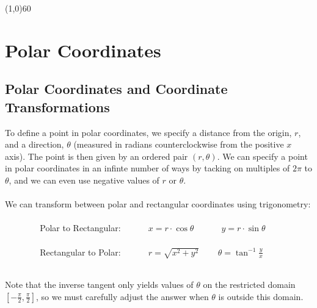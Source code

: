 \documentclass[10.5pt,twoside]{report}
\theoremstyle{definition}
\begin{document}
\line(1,0){60}
\linethickness{0.5mm}
\pagebreak

\section{Polar Coordinates}\label{Polar Coordinates}

\subsection{Polar Coordinates and Coordinate Transformations}

To define a point in polar coordinates, we specify a distance from the origin, $r$, and a direction, $\theta$ (measured in radians counterclockwise from the positive $x$ axis).  The point is then given by an ordered pair $(r,\theta)$.  We can specify a point in polar coordinates in an infinte number of ways by tacking on multiples of $2\pi$ to $\theta$, and we can even use negative values of $r$ or $\theta$. \\
${}$\\
We can transform between polar and rectangular coordinates using trigonometry:\\
${}$\\

\verb|        |Polar to Rectangular: \verb|     | $x=r\cdot \cos{\theta}$ \verb|     | $y=r\cdot \sin{\theta}$\\
${}$\\
\verb|        |Rectangular to Polar: \verb|     | $r=\sqrt{x^2+y^2}$ \verb|   |  $\theta = \tan^{-1} \frac{y}{x}$

${}$\\
Note that the inverse tangent only yields values of $\theta$ on the restricted domain $\left[ -\frac{\pi}{2},\frac{\pi}{2} \right]$, so we must carefully adjust the answer when $\theta$ is outside this domain.\\
${}$\\
\end{document}
